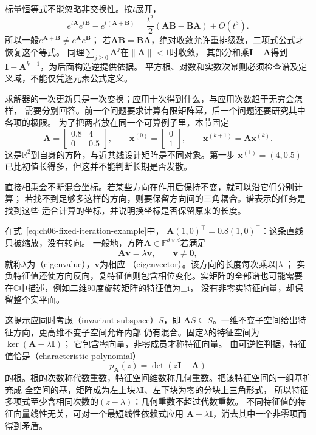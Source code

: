 标量恒等式不能忽略非交换性。按$t$展开，
\[
 e^{t\bm A}e^{t\bm B}-e^{t(\bm A+\bm B)}
 =\frac{t^2}{2}(\bm A\bm B-\bm B\bm A)+O(t^3).
\]
所以一般$e^{\bm A+\bm B}\neq e^{\bm A}e^{\bm B}$；
若$\bm A\bm B=\bm B\bm A$，绝对收敛允许重排级数，二项式公式才恢复这个等式。
同理$\sum_{j\geq0}\bm A^j$在$\lVert\bm A\rVert<1$时收敛，
其部分和乘$\bm I-\bm A$得到$\bm I-\bm A^{k+1}$，为后面构造逆提供依据。
平方根、对数和实数次幂则必须检查谱及定义域，不能仅凭逐元素公式定义。


求解器的一次更新只是一次变换；应用十次得到什么，与应用次数趋于无穷会怎样，
需要分别回答。前一个问题要求计算有限矩阵幂，后一个问题还要研究其中各项的极限。
为了把两者放在同一个可算例子里，本节固定
\begin{equation}
 \bm A=\begin{bmatrix}0.8&4\\0&0.5\end{bmatrix},
 \qquad
 \bm x^{(0)}=\begin{bmatrix}0\\1\end{bmatrix},
 \qquad \bm x^{(k+1)}=\bm A\bm x^{(k)}.
 \label{eq:ch06-fixed-iteration-example}
\end{equation}
这是$\mathbb R^2$到自身的方阵，与近共线设计矩阵是不同对象。第一步
$\bm x^{(1)}=(4,0.5)^\top$已比初值长得多，但这并不能判断长期是否发散。


直接相乘会不断混合坐标。若某些方向在作用后保持不变，就可以沿它们分别计算；
若找不到足够多这样的方向，则要保留方向间的三角耦合。谱表示的任务是找到这些
适合计算的坐标，并说明换坐标是否保留原来的长度。


在式~\eqref{eq:ch06-fixed-iteration-example}中，
$\bm A(1,0)^\top=0.8(1,0)^\top$：这条直线只被缩放，没有转向。
一般地，方阵$\bm A\in\mathbb F^{d\times d}$若满足
\begin{equation}
 \bm A\bm v=\lambda\bm v,\qquad \bm v\neq\bm0,
 \label{eq:matrix-analysis-eigenpair}
\end{equation}
就称$\lambda$为（eigenvalue），$\bm v$为相应
（eigenvector）。该方向的长度每次乘以$|\lambda|$；
实负特征值还使方向反向，复特征值则包含相位变化。实矩阵的全部谱也可能需要
在$\mathbb C$中描述，例如二维$90$度旋转矩阵的特征值为$\pm\mathrm i$，
没有非零实特征向量，却保留整个实平面。

这提示应同时考虑（invariant subspace）$S$，即
$\bm A S\subseteq S$。一维不变子空间给出特征方向，更高维不变子空间允许内部
仍有混合。固定$\lambda$的特征空间为$\ker(\bm A-\lambda\bm I)$；
它包含零向量，非零成员才称特征向量。
由可逆性判据，特征值恰是（characteristic polynomial）
\begin{equation}
 p_{\bm A}(z)=\det(z\bm I-\bm A)
 \label{eq:matrix-analysis-characteristic-polynomial}
\end{equation}
的根。根的次数称代数重数，特征空间维数称几何重数。把该特征空间的一组基扩充成
全空间的基，矩阵成为左上块$\lambda\bm I$、左下块为零的分块上三角形式，
所以特征多项式至少含相同次数的$(z-\lambda)$：几何重数不超过代数重数。
不同特征值的特征向量线性无关，可对一个最短线性依赖式应用
$\bm A-\lambda\bm I$，消去其中一个非零项而得到矛盾。

